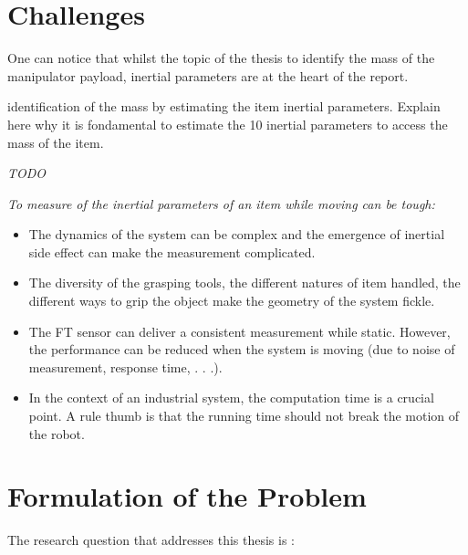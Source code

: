 \documentclass[/home/francois/latex/report/main.tex]{subfiles}
\begin{document}
\section{Challenges}

One can notice that whilst the topic of the thesis to identify the mass of the manipulator payload, inertial parameters are at the heart of the report.


  identification of the mass by estimating the item inertial parameters. Explain here why it is fondamental to estimate the 10 inertial parameters to access the mass of the item.


\textit{TODO}

{\it
To measure of the inertial parameters of an item while moving can be tough:

\begin{itemize}
	\item The dynamics of the system can be complex and the emergence of inertial side effect can make the measurement complicated.
	\item The diversity of the grasping tools, the different natures of item handled, the different ways to grip the object make the geometry of the system fickle.
	\item The \ac{FT} sensor can deliver a consistent measurement while static. However, the performance can be reduced when the system is moving (due to noise of measurement, response time, . . .).
	\item In the context of an industrial system, the computation time is a crucial point. A rule  thumb is that the running time should not break the motion of the robot.
\end{itemize}
}


\section{Formulation of the Problem}

The research question that addresses this thesis is :
\end{document}
